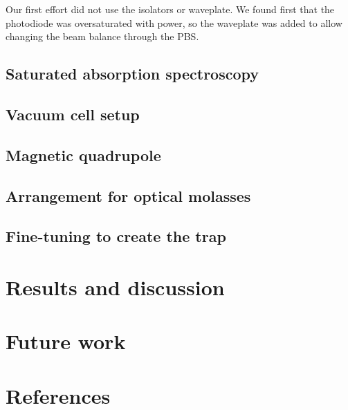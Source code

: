 \documentclass[11pt,twoside,a4paper]{article}
\begin{document}
Our first effort did not use the isolators or waveplate. We found first that the photodiode was oversaturated with power, so the waveplate
was added to allow changing the beam balance through the PBS.\@
\subsection{Saturated absorption spectroscopy}
\subsection{Vacuum cell setup}
\subsection{Magnetic quadrupole}
\subsection{Arrangement for optical molasses}
\subsection{Fine-tuning to create the trap}
\section{Results and discussion}
\section{Future work}
\vfill
\pagebreak
\section{References}


\end{document}
